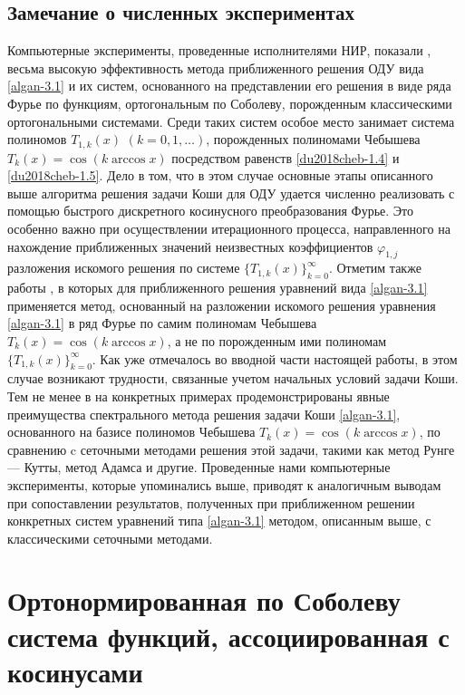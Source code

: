 \section{Замечание о численных экспериментах}
Компьютерные эксперименты, проведенные исполнителями НИР, показали \cite{du2018cheb-MMG2016}, \cite{du2018cheb-SHII-MMG2018}  весьма высокую эффективность метода приближенного решения ОДУ вида \eqref{algan-3.1} и их систем, основанного на представлении его решения в виде ряда Фурье по функциям, ортогональным по Соболеву, порожденным классическими ортогональными системами. Среди таких систем особое место занимает система полиномов $T_{1,k}(x)$ $(k=0,1,\ldots)$, порожденных полиномами Чебышева   $T_k(x)=\cos(k\arccos x)$ посредством равенств \eqref{du2018cheb-1.4} и \eqref{du2018cheb-1.5}. Дело в том, что в этом случае основные этапы описанного выше алгоритма решения задачи Коши для ОДУ удается численно реализовать с помощью быстрого дискретного косинусного преобразования Фурье. Это особенно важно при осуществлении итерационного процесса, направленного на нахождение приближенных значений неизвестных коэффициентов $\varphi_{1,j}$ разложения искомого решения по системе $\{T_{1,k}(x)\}_{k=0}^\infty$. Отметим также работы
\cite{du2018cheb-Arush2010,du2018cheb-Arush2013,du2018cheb-Arush2014}, в которых для приближенного решения уравнений вида \eqref{algan-3.1} применяется  метод, основанный на разложении искомого решения уравнения \eqref{algan-3.1} в ряд Фурье по самим полиномам Чебышева
$T_k(x)=\cos(k\arccos x)$, а не по порожденным ими полиномам $\{T_{1,k}(x)\}_{k=0}^\infty$. Как уже отмечалось во вводной части настоящей работы, в этом случае возникают трудности, связанные учетом начальных условий задачи Коши. Тем не менее в \cite{du2018cheb-Arush2010,du2018cheb-Arush2013,du2018cheb-Arush2014} на конкретных примерах продемонстрированы явные преимущества спектрального метода решения задачи Коши \eqref{algan-3.1}, основанного на базисе полиномов Чебышева $T_k(x)=\cos(k\arccos x)$, по сравнению c сеточными методами решения этой задачи, такими как метод Рунге --- Кутты, метод Адамса и другие. Проведенные нами компьютерные эксперименты, которые упоминались выше, приводят к аналогичным выводам при сопоставлении результатов, полученных при приближенном  решении конкретных систем уравнений типа \eqref{algan-3.1} методом, описанным выше, с классическими сеточными методами.




\chapter{Ортонормированная по Соболеву система функций, ассоциированная с косинусами}

